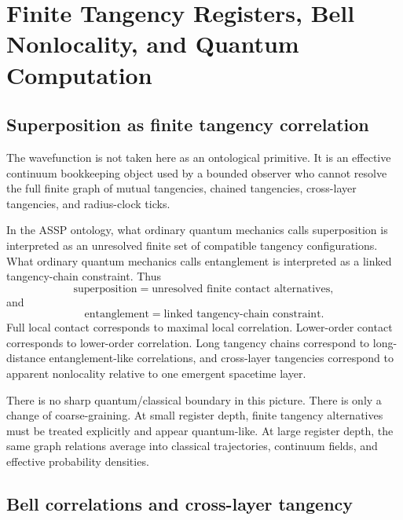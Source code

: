 \documentclass[11pt,a4paper]{article}
\begin{document}
\section{Finite Tangency Registers, Bell Nonlocality, and Quantum Computation}
\label{sec:finite_quantum_registers}

\subsection{Superposition as finite tangency correlation}

The wavefunction is not taken here as an ontological primitive.  It is an
effective continuum bookkeeping object used by a bounded observer who cannot
resolve the full finite graph of mutual tangencies, chained tangencies,
cross-layer tangencies, and radius-clock ticks.

In the ASSP ontology, what ordinary quantum mechanics calls superposition is
interpreted as an unresolved finite set of compatible tangency configurations.
What ordinary quantum mechanics calls entanglement is interpreted as a linked
tangency-chain constraint.  Thus
\begin{equation}
  \boxed{
  \text{superposition}
  =
  \text{unresolved finite contact alternatives},
  }
  \label{eq:superposition_contact}
\end{equation}
and
\begin{equation}
  \boxed{
  \text{entanglement}
  =
  \text{linked tangency-chain constraint}.
  }
  \label{eq:entanglement_chain}
\end{equation}
Full local contact corresponds to maximal local correlation.  Lower-order
contact corresponds to lower-order correlation.  Long tangency chains
correspond to long-distance entanglement-like correlations, and cross-layer
tangencies correspond to apparent nonlocality relative to one emergent
spacetime layer.

There is no sharp quantum/classical boundary in this picture.  There is only a
change of coarse-graining.  At small register depth, finite tangency
alternatives must be treated explicitly and appear quantum-like.  At large
register depth, the same graph relations average into classical trajectories,
continuum fields, and effective probability densities.

\subsection{Bell correlations and cross-layer tangency}
\end{document}
